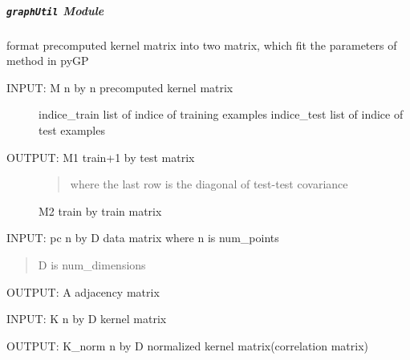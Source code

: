 \documentclass[letterpaper,10pt,english]{sphinxmanual}
\begin{document}
\subparagraph{\texttt{graphUtil} Module}
\label{pyGPs.GraphExtension:graphutil-module}\label{pyGPs.GraphExtension:module-pyGPs.GraphExtension.graphUtil}

\begin{fulllineitems}
\label{pyGPs.GraphExtension:pyGPs.GraphExtension.graphUtil.formKernelMatrix}
format precomputed kernel matrix into two matrix,
which fit the parameters of method in pyGP
\begin{description}
\item[{INPUT:    M             n by n precomputed kernel matrix}] \leavevmode
indice\_train  list of indice of training examples
indice\_test   list of indice of test examples

\item[{OUTPUT:   M1            train+1 by test matrix}] \leavevmode\begin{quote}

where the last row is the diagonal of test-test covariance
\end{quote}

M2            train by train matrix

\end{description}

\end{fulllineitems}


\begin{fulllineitems}
\label{pyGPs.GraphExtension:pyGPs.GraphExtension.graphUtil.formKnnGraph}
INPUT:     pc    n by D data matrix
where n is num\_points
\begin{quote}

D is num\_dimensions
\end{quote}

OUTPUT:    A     adjacency matrix

\end{fulllineitems}


\begin{fulllineitems}
\label{pyGPs.GraphExtension:pyGPs.GraphExtension.graphUtil.normalizeKernel}
INPUT:     K        n by D kernel matrix

OUTPUT:    K\_norm   n by D normalized kernel matrix(correlation matrix)

\end{fulllineitems}
\end{document}
